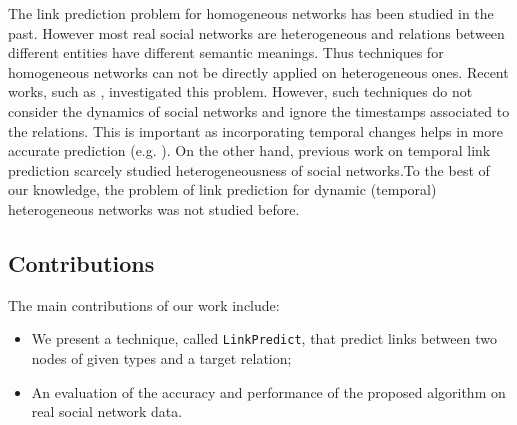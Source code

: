The link prediction problem for homogeneous networks has been studied in the past. However most real social networks are heterogeneous and relations between different entities have different semantic meanings. Thus techniques for homogeneous networks can not be directly applied on heterogeneous ones. Recent works, such as \cite{sun2011pathsim,sun2011ASONAM}, investigated this problem. However, such techniques do not consider the dynamics of social networks and ignore the timestamps associated to the relations. This is important as incorporating temporal changes helps in more accurate prediction (e.g. \cite{Zhu2016}). On the other hand, previous work on temporal link prediction scarcely studied heterogeneousness of social networks.To the best of our knowledge, the problem of link prediction for dynamic (temporal) heterogeneous networks was not studied before.



\subsection{Contributions}

The main contributions of our work include:

\begin{itemize}

\item We present a technique, called \texttt{LinkPredict}, that predict links between two nodes of given types and a target relation;

\item An evaluation of the accuracy and performance of the proposed algorithm on real social network data.

\end{itemize}







